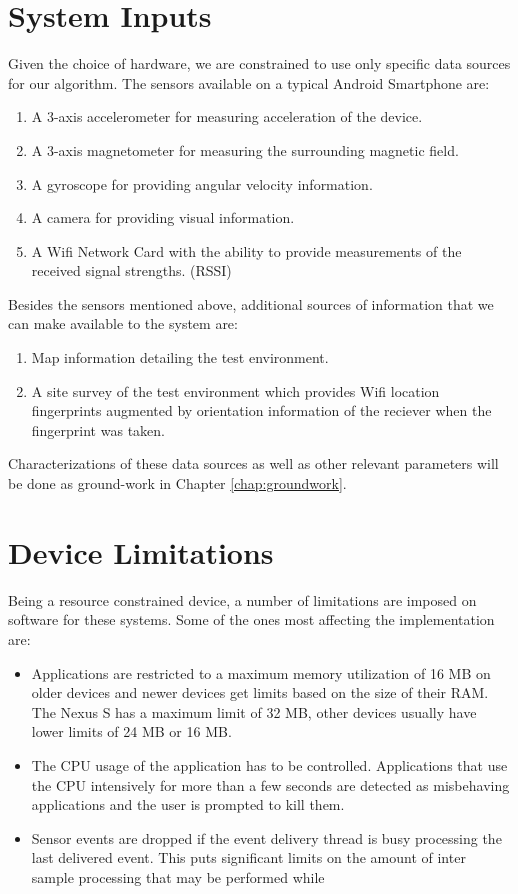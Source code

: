 \section{System Inputs\label{sec:system_inputs}}

Given the choice of hardware, we are constrained to use only specific 
data sources for our algorithm. 
The sensors available on a typical Android Smartphone are:
\begin{enumerate}
\item A 3-axis accelerometer for measuring acceleration of the device.
\item A 3-axis magnetometer for measuring the surrounding magnetic field.
\item A gyroscope for providing angular velocity information.
\item A camera for providing visual information.
\item A Wifi Network Card with the ability to provide measurements of the received signal strengths. (RSSI)
\end{enumerate}

Besides the sensors mentioned above, additional sources of information 
that we can make available to the system are:

\begin{enumerate}
\item Map information detailing the test environment.
\item A site survey of the test environment which provides Wifi location fingerprints augmented by 
    orientation information of the reciever when the fingerprint was taken.
\end{enumerate}

Characterizations of these data sources as well
as other relevant parameters will be done as ground-work in 
Chapter \ref{chap:groundwork}.

\section{Device Limitations\label{sec:device_limitations}}

Being a resource constrained device, a number of limitations are imposed on 
software for these systems. Some of the ones most affecting the implementation
are:

\begin{itemize}
\item Applications are restricted to a maximum memory utilization of 16 MB on 
    older devices and newer devices get limits based on the size of their 
    RAM. The Nexus S has a maximum limit of 32 MB, other devices usually have
    lower limits of 24 MB or 16 MB.
\item The CPU usage of the application has to be controlled. Applications 
    that use the CPU intensively for more than a few seconds are detected as 
    misbehaving applications and the user is prompted to kill them.
\item Sensor events are dropped if the event delivery thread is busy processing
    the last delivered event. This puts significant limits on the 
    amount of inter sample processing that may be performed while 
\end{itemize}



